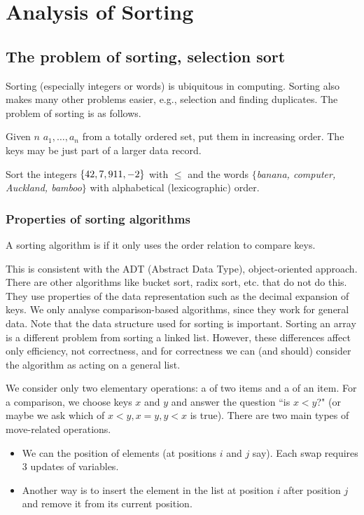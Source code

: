 \part{Analysis of Sorting}  
\label{ch:effsort}

\chapter{The problem of sorting, selection sort} %
\label{sec:sortingproblem}
Sorting (especially integers or words) is ubiquitous in computing.
Sorting also makes many other problems easier, e.g., selection and finding duplicates.
The problem of sorting is as follows. 

\begin{Definition}
Given $n$  $a_1, \dots , a_n$ from a totally ordered set, put them in increasing order. 
The keys may be just part of a larger data record.
\end{Definition}
\begin{Boxample}[3]
Sort the integers $\mbox{$\{42, 7, 911, -2\}$}$ with $\leq$ 
and the words $\{$\textit{banana, computer, Auckland, bamboo}$\}$ with  alphabetical (lexicographic) order.
\end{Boxample}



\section{Properties of sorting algorithms}
\begin{Definition}
A sorting algorithm is  if it only uses the order relation to compare keys.
\end{Definition}

This is consistent with the ADT (Abstract Data Type), object-oriented approach. 
There are other algorithms like bucket sort, radix sort, etc. that do not do this. 
They use properties of the data representation such as the decimal expansion of keys.
We only analyse comparison-based algorithms, since they work for general data. Note that the data structure used for sorting is important. 
Sorting an array is a different problem from sorting a linked list. 
However, these differences affect  only efficiency, not correctness, and for correctness we can (and should) consider the algorithm as acting on a general list. 


We consider only two elementary operations: a  of two items and a  of an item.
For a comparison, we choose keys $x$ and $y$ and answer the question ``is $x<y$?" (or maybe we ask which of $x < y, x = y, y < x$ is true). 
There are two main types of move-related operations. 
\begin{itemize}
\item We can  the position of elements (at positions $i$ and $j$ say). 
Each swap requires 3 updates of variables.
\item Another way is to insert the element in the list at position $i$ after position $j$ and remove it from its current position.
\end{itemize}

